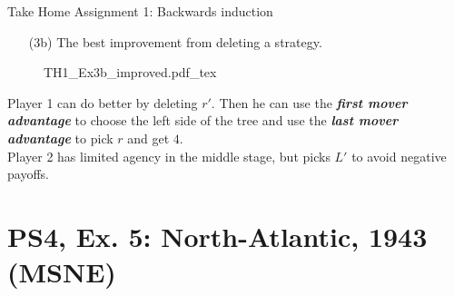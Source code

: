 \begin{frame}{Take Home Assignment 1: Backwards induction}
  \begin{itemize}
    \item[(3b)] The best improvement from deleting a strategy.
  \end{itemize}
  \begin{figure}[!h]
    \begin{center}
    \def\svgwidth{\columnwidth}
    {TH1_Ex3b_improved.pdf_tex}
    \end{center}
  \end{figure}
  Player 1 can do better by deleting $r'$. Then he can use the \textit{\textbf{first mover advantage}} to choose the left side of the tree and use the \textit{\textbf{last mover advantage}} to pick $r$ and get $4$.\\\medskip
  Player 2 has limited agency in the middle stage, but picks $L'$ to avoid negative payoffs.
\end{frame}

\section{PS4, Ex. 5: North-Atlantic, 1943 (MSNE)}

